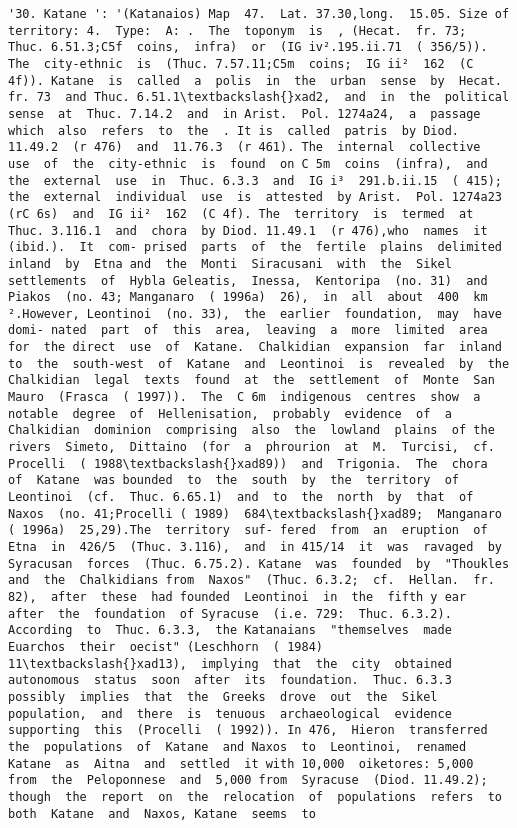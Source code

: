 \documentclass[11pt]{article}
\begin{document}
\begin{Verbatim}[commandchars=\\\{\}]
         '30. Katane ': '(Katanaios) Map  47.  Lat. 37.30,long.  15.05. Size of  territory: 4.  Type:  A: .  The  toponym  is  , (Hecat.  fr. 73;  Thuc. 6.51.3;C5f  coins,  infra)  or  (IG iv².195.ii.71  ( 356/5)).  The  city-ethnic  is  (Thuc. 7.57.11;C5m  coins;  IG ii²  162  (C 4f)). Katane  is  called  a  polis  in  the  urban  sense  by  Hecat.  fr. 73  and Thuc. 6.51.1\textbackslash{}xad2,  and  in  the  political  sense  at  Thuc. 7.14.2  and  in Arist.  Pol. 1274a24,  a  passage  which  also  refers  to  the  . It is  called  patris  by Diod. 11.49.2  (r 476)  and  11.76.3  (r 461). The  internal  collective  use  of  the  city-ethnic  is  found  on C 5m  coins  (infra),  and  the  external  use  in  Thuc. 6.3.3  and  IG i³  291.b.ii.15  ( 415);  the  external  individual  use  is  attested  by Arist.  Pol. 1274a23  (rC 6s)  and  IG ii²  162  (C 4f). The  territory  is  termed  at  Thuc. 3.116.1  and  chora  by Diod. 11.49.1  (r 476),who  names  it  (ibid.).  It  com- prised  parts  of  the  fertile  plains  delimited  inland  by  Etna and  the  Monti  Siracusani  with  the  Sikel  settlements  of  Hybla Geleatis,  Inessa,  Kentoripa  (no. 31)  and  Piakos  (no. 43; Manganaro  ( 1996a)  26),  in  all  about  400  km ².However, Leontinoi  (no. 33),  the  earlier  foundation,  may  have  domi- nated  part  of  this  area,  leaving  a  more  limited  area  for  the direct  use  of  Katane.  Chalkidian  expansion  far  inland  to  the  south-west  of  Katane  and  Leontinoi  is  revealed  by  the Chalkidian  legal  texts  found  at  the  settlement  of  Monte  San Mauro  (Frasca  ( 1997)).  The  C 6m  indigenous  centres  show  a notable  degree  of  Hellenisation,  probably  evidence  of  a Chalkidian  dominion  comprising  also  the  lowland  plains  of the  rivers  Simeto,  Dittaino  (for  a  phrourion  at  M.  Turcisi,  cf. Procelli  ( 1988\textbackslash{}xad89))  and  Trigonia.  The  chora  of  Katane  was bounded  to  the  south  by  the  territory  of  Leontinoi  (cf.  Thuc. 6.65.1)  and  to  the  north  by  that  of  Naxos  (no. 41;Procelli ( 1989)  684\textbackslash{}xad89;  Manganaro  ( 1996a)  25,29).The  territory  suf- fered  from  an  eruption  of  Etna  in  426/5  (Thuc. 3.116),  and  in 415/14  it  was  ravaged  by  Syracusan  forces  (Thuc. 6.75.2). Katane  was  founded  by  "Thoukles  and  the  Chalkidians from  Naxos"  (Thuc. 6.3.2;  cf.  Hellan.  fr. 82),  after  these  had founded  Leontinoi  in  the  fifth y ear  after  the  foundation  of Syracuse  (i.e. 729:  Thuc. 6.3.2).  According  to  Thuc. 6.3.3,  the Katanaians  "themselves  made  Euarchos  their  oecist" (Leschhorn  ( 1984)  11\textbackslash{}xad13),  implying  that  the  city  obtained autonomous  status  soon  after  its  foundation.  Thuc. 6.3.3  possibly  implies  that  the  Greeks  drove  out  the  Sikel population,  and  there  is  tenuous  archaeological  evidence supporting  this  (Procelli  ( 1992)). In 476,  Hieron  transferred  the  populations  of  Katane  and Naxos  to  Leontinoi,  renamed  Katane  as  Aitna  and  settled  it with 10,000  oiketores: 5,000  from  the  Peloponnese  and  5,000 from  Syracuse  (Diod. 11.49.2);  though  the  report  on  the  relocation  of  populations  refers  to  both  Katane  and  Naxos, Katane  seems  to  
\end{Verbatim}
\end{document}
